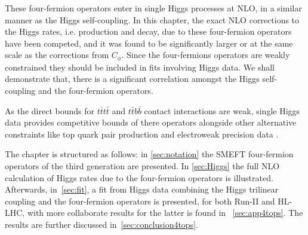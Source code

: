 \par These four-fermion operators enter in single Higgs processes at NLO, in a similar manner as the Higgs self-coupling. In this chapter, the exact NLO corrections to the Higgs rates, i.e. production and decay, due to these four-fermion operators have been competed, and it was found to be significantly larger or at the same scale as the corrections from $C_\phi$. Since the four-fermions operators are weakly constrained they should be included in fits involving Higgs data. We shall demonstrate that, there is a significant correlation amongst the Higgs self-coupling and the four-fermion operators.
\par As the direct bounds for  $t\bar{t}t\bar{t}$ and $t\bar{t}b\bar{b}$ contact interactions are weak, single Higgs data provides competitive bounds of there operators alongside other alternative constraints like top quark pair production \cite{Degrande:2020evl} and electroweak precision data \cite{deBlas:2015aea} .
\par 
The chapter is structured as follows: in \autoref{sec:notation} the SMEFT four-fermion operators of the third generation are presented. In \autoref{sec:Higgs} the full NLO calculation of Higgs rates due to the four-fermion operators is illustrated. Afterwards, in~\autoref{sec:fit}, a fit from Higgs data combining the Higgs trilinear coupling and the four-fermion operators is presented, for both Run-II and HL-LHC, with more collaborate results for the latter is found in ~\autoref{sec:app4tops}. The results are further discussed in~\autoref{sec:conclusion4tops}.

